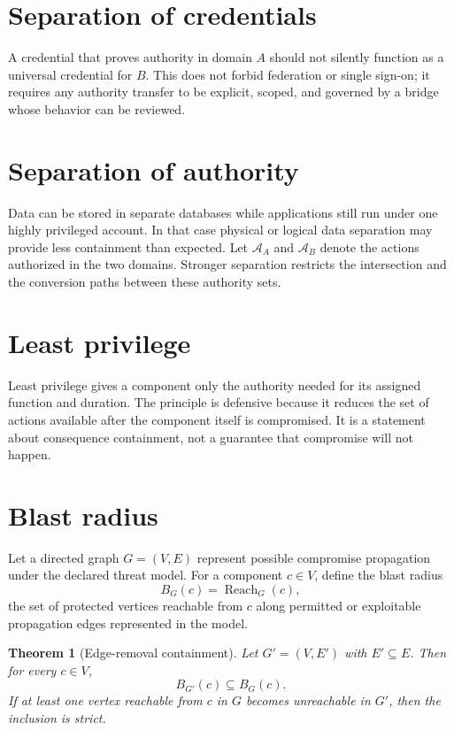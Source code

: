 \documentclass[11pt,oneside]{book}
\newtheorem{theorem}{Theorem}[chapter]
\theoremstyle{definition}
\theoremstyle{remark}
\newcommand{\Reach}{\operatorname{Reach}}
\begin{document}
\section{Separation of credentials}
A credential that proves authority in domain $A$ should not silently function as a universal credential for $B$. This does not forbid federation or single sign-on; it requires any authority transfer to be explicit, scoped, and governed by a bridge whose behavior can be reviewed.

\section{Separation of authority}
Data can be stored in separate databases while applications still run under one highly privileged account. In that case physical or logical data separation may provide less containment than expected. Let $\mathcal A_A$ and $\mathcal A_B$ denote the actions authorized in the two domains. Stronger separation restricts the intersection and the conversion paths between these authority sets.

\section{Least privilege}
Least privilege gives a component only the authority needed for its assigned function and duration. The principle is defensive because it reduces the set of actions available after the component itself is compromised. It is a statement about consequence containment, not a guarantee that compromise will not happen.

\section{Blast radius}
\label{sec:blast-radius}
Let a directed graph $G=(V,E)$ represent possible compromise propagation under the declared threat model. For a component $c\in V$, define the blast radius
\[
B_G(c)=\Reach_G(c),
\]
the set of protected vertices reachable from $c$ along permitted or exploitable propagation edges represented in the model.

\begin{theorem}[Edge-removal containment]
Let $G'=(V,E')$ with $E'\subseteq E$. Then for every $c\in V$,
\[
B_{G'}(c)\subseteq B_G(c).
\]
If at least one vertex reachable from $c$ in $G$ becomes unreachable in $G'$, then the inclusion is strict.
\end{theorem}
\end{document}
